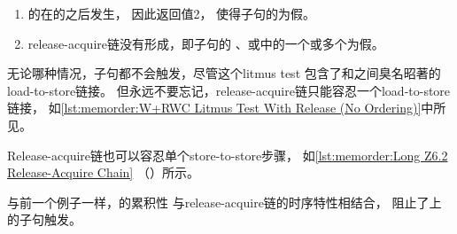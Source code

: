 \begin{listing}

\caption{长ISA2 Release-Acquire链}
\label{lst:memorder:Long ISA2 Release-Acquire Chain}
\end{listing}

\begin{enumerate}
\item	{}的在的之后发生，
	因此返回值2，
	使得子句的为假。
\item	release-acquire链没有形成，即子句的
	、或中的一个或多个为假。
\end{enumerate}

无论哪种情况，子句都不会触发，尽管这个litmus test
包含了和之间臭名昭著的load-to-store链接。
但永远不要忘记，release-acquire链只能容忍一个load-to-store链接，
如\cref{lst:memorder:W+RWC Litmus Test With Release (No Ordering)}中所见。

\begin{listing}

\caption{长Z6.2 Release-Acquire链}
\label{lst:memorder:Long Z6.2 Release-Acquire Chain}
\end{listing}

Release-acquire链也可以容忍单个store-to-store步骤，
如\cref{lst:memorder:Long Z6.2 Release-Acquire Chain}
（）所示。
\begin{fcvref}
与前一个例子一样，的累积性
与release-acquire链的时序特性相结合，
阻止了上的子句触发。
\end{fcvref}

\begin{listing}

\caption{Z6.2 Release-Acquire链（有排序吗？）}
\label{lst:memorder:Z6.2 Release-Acquire Chain (Ordering?)}
\end{listing}

\QuickQuizEnd

